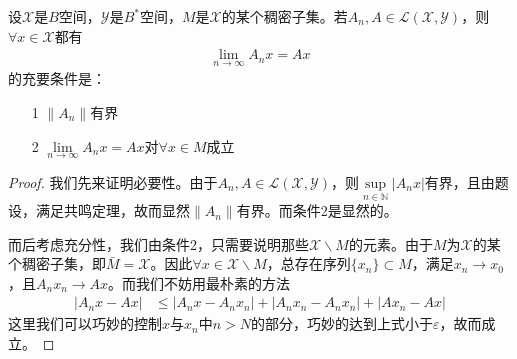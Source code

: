 \begin{theorem}
    设$\mathscr{X}$是$B$空间，$\mathscr{Y}$是$B^*$空间，$M$是$\mathscr{X}$的某个稠密子集。若$A_n,A\in\mathscr{L}(\mathscr{X},\mathscr{Y})$，则$\forall x\in\mathscr{X}$都有
    \begin{align*}
        \lim\limits_{n\to\infty} A_n x = Ax
    \end{align*}
    的充要条件是：
    \begin{itemize}
        \item[1] $\|A_n\|$有界
        \item[2] $\lim\limits_{n\to\infty} A_n x = Ax$对$\forall x\in M$成立
    \end{itemize}
\end{theorem}
\begin{proof}
    我们先来证明必要性。由于$A_n, A\in\mathscr{L}(\mathscr{X},\mathscr{Y})$，则$\sup\limits_{n\in \mathbb{N}} |A_n x|$有界，且由题设，满足共鸣定理，故而显然$\|A_n\|$有界。而条件2是显然的。

    而后考虑充分性，我们由条件2，只需要说明那些$\mathscr{X}\backslash M$的元素。由于$M$为$\mathscr{X}$的某个稠密子集，即$\bar{M} = \mathscr{X}$。因此$\forall x\in \mathscr{X}\backslash M$，总存在序列$\{x_n\}\subset M$，满足$x_n\to x_0$，且$A_n x_n \to Ax$。而我们不妨用最朴素的方法
    \begin{align*}
        |A_n x - Ax| & \leqslant |A_n x - A_n x_n| + |A_n x_n - A_n x_n| + |A x_n - Ax|
    \end{align*}
    这里我们可以巧妙的控制$x$与$x_n$中$n>N$的部分，巧妙的达到上式小于$\varepsilon$，故而成立。
\end{proof}

